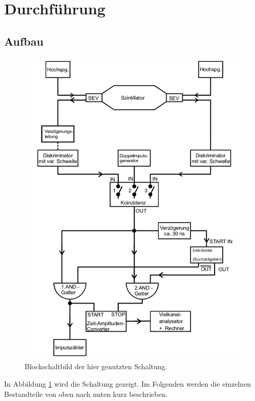  \section{Durchführung}
\label{sec:Durchführung}
\subsection{Aufbau}
\begin{figure}
  \centering
  \includegraphics[width=\textwidth]{leuteBeimKacken/Schaltung.png}
  \caption{Blockschaltbild der hier genutzten Schaltung.\cite{anleitung}}
  \label{fig:Schaltung}
\end{figure}

In Abbildung \ref{fig:Schaltung} wird die Schaltung gezeigt. Im Folgenden werden die einzelnen Bestandteile von oben nach unten kurz beschrieben.

